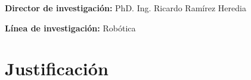 \renewcommand{\tablename}{Tabla}

\maketitle
{}
{\large\textbf{Director de investigaci\'on:} PhD. Ing. Ricardo Ram\'irez Heredia}\par\vspace{0.7cm}
{\large\textbf{L\'inea de investigaci\'on:} Rob\'otica}
\section[Justificaci\'on]{Justificaci\'on}
\label{sec:justify}

